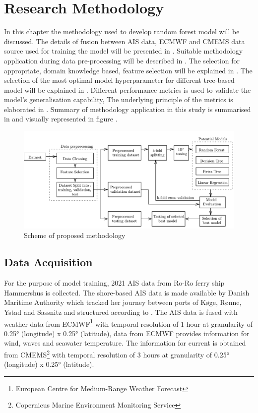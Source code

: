 \chapter{Research Methodology} \label{chp:method}

In this chapter the methodology used to develop random forest model will be discussed. The details of fusion between AIS data, ECMWF and CMEMS data source used for training the model will be presented in . Suitable methodology application during data pre-processing will be described in . The selection for appropriate, domain knowledge based, feature selection will be explained in . The selection of the most optimal model hyperparameter for different tree-based model will be explained in . Different performance metrics is used to validate the model's generalisation capability, The underlying principle of the metrics is elaborated in . Summary of methodology application in this study is summarised in  and visually represented in figure . 

\begin{figure}[h]
    \centering
        \includegraphics[width=\textwidth]{02_figures/flowmethod2.png}
        \caption{Scheme of proposed methodology}
        \label{fig:flowchart}
\end{figure}

\section{Data Acquisition}\label{sec:data_acquisition}

For the purpose of model training, 2021 AIS data from Ro-Ro ferry ship Hammershus is collected. The shore-based AIS data is made available by Danish Maritime Authority which tracked her journey between ports of K{\o}ge, R{\o}nne, Ystad and Sassnitz and structured according to . The AIS data is fused with weather data from ECMWF\footnote{European Centre for Medium-Range Weather Forecast} with temporal resolution of 1 hour at granularity of 0.25° (longitude) x 0.25° (latitude), data from ECMWF provides information for wind, waves and seawater temperature. The information for current is obtained from CMEMS\footnote{Copernicus Marine Environment Monitoring Service} with temporal resolution of 3 hours at granularity of  0.25° (longitude) x 0.25° (latitude).\\ 

